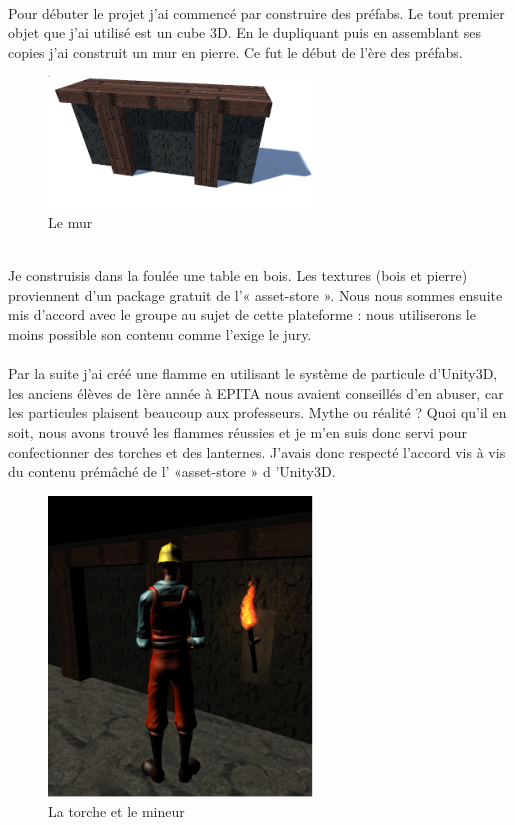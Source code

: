 \documentclass[titlepage, 13px, a4paper]{report}
\begin{document}
\paragraph*{} \hspace{0pt} 
Pour débuter le projet j'ai commencé par construire des préfabs. Le tout premier
objet que j'ai utilisé est un cube 3D. En le dupliquant puis en assemblant ses
copies j'ai construit un mur en pierre. Ce fut le début de l'ère des préfabs. 
\begin{figure}
  \centering
  \includegraphics[width=7cm]{images/antoine_mur.png}
  \caption{Le mur}
\end{figure}
\\
Je construisis dans la foulée une table en bois. Les textures (bois et pierre)
proviennent d'un package gratuit de l'« asset-store ». Nous nous sommes ensuite
mis d'accord avec le groupe au sujet de cette plateforme : nous utiliserons le
moins possible son contenu comme l'exige le jury. \\

\paragraph*{} \hspace{0pt} 
Par la suite j'ai créé une flamme en utilisant le système de particule d'Unity3D, les
anciens élèves de 1ère année à EPITA nous avaient conseillés d'en abuser, car les
particules plaisent beaucoup aux professeurs. Mythe ou réalité ? Quoi qu'il en soit,
nous avons trouvé les flammes réussies et je m'en suis donc servi pour
confectionner des torches et des lanternes. J'avais donc respecté l'accord vis à vis
du contenu prémâché de l' «asset-store » d 'Unity3D. 

\newpage

\begin{figure}
  \centering
  \includegraphics[width=7cm]{images/antoine_mineurtorche.png}
  \caption{La torche et le mineur}
\end{figure}
\end{document}

